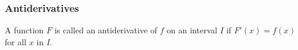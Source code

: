 \begin{frame}
\frametitle{Antiderivatives}
\begin{definition}[Antiderivative]
A function $F$ is called an antiderivative of $f$ on an interval $I$ if $F'(x) = f(x)$ for all $x$ in $I$.
\end{definition}
\end{frame}
